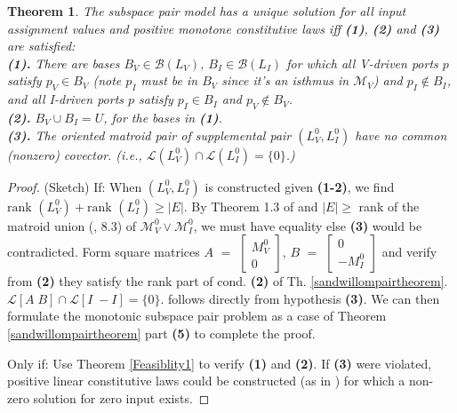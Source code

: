 \documentclass{amsproc-sunycstr}
\theoremstyle{plain}
\newtheorem{theorem}{Theorem}
\theoremstyle{definition}
\theoremstyle{remark}
\newcommand{\hmat}[2]{[#1\;#2]}
\begin{document}
\begin{theorem}
\label{SubspacePairTh}
The subspace pair model has a unique solution for all 
input assignment 
values and positive monotone constitutive laws iff 
\textbf{(1)}, \textbf{(2)} and \textbf{(3)} are satisfied:\\
\textbf{(1).} There are bases $B_V\in\mathcal{B}(L_V)$,
$B_I\in\mathcal{B}(L_I)$ for which all V-driven 
ports $p$ satisfy $p_V\in B_V$ (note $p_I$ must be 
in $B_V$ since it's an isthmus in $\mathcal{M}_V$) 
and $p_I\not\in B_I$,
and all I-driven ports $p$ satisfy $p_I\in B_I$ and 
$p_V \not\in B_V$.  \\
\textbf{(2).}
$B_V\cup B_I = U$, for the bases in \textbf{(1)}.\\
\textbf{(3).} The oriented matroid pair of supplemental pair $(L_V^0,L_I^0)$ 
have no common (nonzero) covector.
(i.e., $\mathcal{L}(L_V^0)\cap\mathcal{L}(L_I^0)=\{0\}$.)
\end{theorem}


\begin{proof} (Sketch)
If:  When $(L_V^0,L_I^0)$ is constructed given
\textbf{(1-2)}, we find $\mbox{rank\ }(L_V^0)+\mbox{rank\ }(L_I^0)\geq|E|$. By
Theorem 1.3 of \cite{sdcOMP}
and $|E|\geq$ rank of the matroid union 
(\cite{Welsh}, 8.3) of $\mathcal{M}_V^0\vee\mathcal{M}_I^0$,
we must have equality else \textbf{(3)} would be 
contradicted.  
Form square matrices
$A$ $=$ $\left[\begin{array}{c}M_V^0\\ 0\end{array}\right]$,
$B$ $=$ $\left[\begin{array}{c}0\\ -M_I^0\end{array}\right]$ and 
verify from \textbf{(2)} they satisfy the rank part of cond. \textbf{(2)} of
Th. \ref{sandwillompairtheorem}. 
${\mathcal L}\hmat{A}{B} \cap {\mathcal L}\hmat{I}{-I}=\{0\}.$
follows directly from hypothesis \textbf{(3)}.  We can then
formulate the monotonic 
subspace pair problem as a case of 
Theorem \ref{sandwillompairtheorem} part \textbf{(5)} to complete the proof.

Only if:  Use Theorem \ref{Feasiblity1} to verify \textbf{(1)} and 
\textbf{(2)}.  
If \textbf{(3)} were violated,
positive linear constitutive laws could be constructed
(as in \cite{HaslerNeirynck,SWExistancePf}) for which 
a non-zero solution for zero input exists.
\end{proof}
\end{document}
